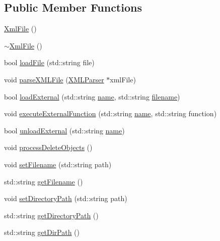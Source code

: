 \subsection*{Public Member Functions}
\begin{DoxyCompactItemize}
\item 
\hyperlink{class_rad_xml_1_1_xml_file_a89c4c345df487667373ec29956f6a4b5}{Xml\-File} ()
\item 
\hyperlink{class_rad_xml_1_1_xml_file_ad0871ea594bb172a623cc1e48d9b41e4}{$\sim$\-Xml\-File} ()
\item 
bool \hyperlink{class_rad_xml_1_1_xml_file_a8212ccd069b0ebfe4c5fbfd867a089d2}{load\-File} (std\-::string file)
\item 
void \hyperlink{class_rad_xml_1_1_xml_file_a9e962caf6cc93ed6e52e7a87575dd188}{parse\-X\-M\-L\-File} (\hyperlink{class_x_m_l_parser}{X\-M\-L\-Parser} $\ast$xml\-File)
\item 
bool \hyperlink{class_rad_xml_1_1_xml_file_aec8385b3ac1ff04f51c6d61a9a15aabc}{load\-External} (std\-::string \hyperlink{class_rad_xml_1_1_level_abc776669bbb0f37a6eed054b3708807b}{name}, std\-::string \hyperlink{class_rad_xml_1_1_xml_file_ab9f8fed4cd65ae694630e081b17c68b6}{filename})
\item 
void \hyperlink{class_rad_xml_1_1_xml_file_a0ad3dadda812845b99e278136e516e13}{execute\-External\-Function} (std\-::string \hyperlink{class_rad_xml_1_1_level_abc776669bbb0f37a6eed054b3708807b}{name}, std\-::string function)
\item 
bool \hyperlink{class_rad_xml_1_1_xml_file_af5b3c7bf1eed2ded19d901572216f35e}{unload\-External} (std\-::string \hyperlink{class_rad_xml_1_1_level_abc776669bbb0f37a6eed054b3708807b}{name})
\item 
void \hyperlink{class_rad_xml_1_1_xml_file_ad7fe1f308b809b9cb0dcadad170e8e29}{process\-Delete\-Objects} ()
\item 
void \hyperlink{class_rad_xml_1_1_xml_file_ac0c6bab8c10e5395a5480cffbb9d1ba3}{set\-Filename} (std\-::string path)
\item 
std\-::string \hyperlink{class_rad_xml_1_1_xml_file_aff179d34509d495abf7b26742401d7de}{get\-Filename} ()
\item 
void \hyperlink{class_rad_xml_1_1_xml_file_aa9b16a74fcda772626d42eff829c855a}{set\-Directory\-Path} (std\-::string path)
\item 
std\-::string \hyperlink{class_rad_xml_1_1_xml_file_a514282f33662a7e339a2eaeae58cc2c2}{get\-Directory\-Path} ()
\item 
std\-::string \hyperlink{class_rad_xml_1_1_xml_file_a2027f7a2c00857f24e2ac030edbb22bf}{get\-Dir\-Path} ()
\end{DoxyCompactItemize}
